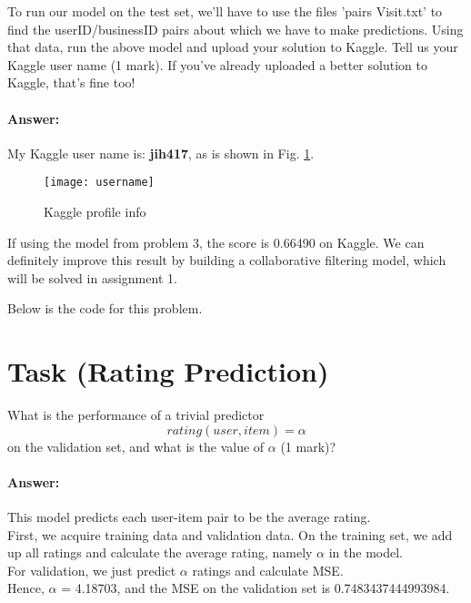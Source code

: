 \documentclass{assignment}
\begin{document}
\begin{problemlist}

\newpage

\pbitem
To run our model on the test set, we'll have to use the files 'pairs Visit.txt' to find the userID/businessID pairs about which we have to make predictions. Using that data, run the above model and upload your solution to Kaggle. Tell us your Kaggle user name (1 mark). If you've already uploaded a better solution to Kaggle, that's fine too!

\paragraph{Answer:}
My Kaggle user name is: \textbf{jih417}, as is shown in Fig. \ref{fig:username}.\\

\begin{figure}[htbp]
	\centering
	\texttt{[image: username]}
	\caption{Kaggle profile info}
    \label{fig:username}
\end{figure}

If using the model from problem 3, the score is 0.66490 on Kaggle. We can definitely improve this result by building a collaborative filtering model, which will be solved in assignment 1.

Below is the code for this problem.

\newpage



\section{Task (Rating Prediction)}
\pbitem
What is the performance of a trivial predictor
\begin{equation}
rating(user, item) = \alpha
\end{equation}
on the validation set, and what is the value of $\alpha$ (1 mark)?\\

\paragraph{Answer:}
This model predicts each user-item pair to be the average rating. \\
First, we acquire training data and validation data. On the training set, we add up all ratings and calculate the average rating, namely $\alpha$ in the model. \\
For validation, we just predict $\alpha$ ratings and calculate MSE.\\
Hence, $\alpha$ = 4.18703, and the MSE on the validation set is 0.7483437444993984.


\end{problemlist}
\end{document}
